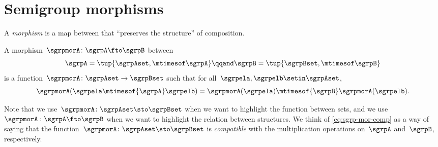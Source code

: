 

\section{Semigroup morphisms}
\label{sec:semigroup-morphisms}

A \emph{morphism} is a map between  that ``preserves the structure'' of composition.



\begin{ctdefinition}
    \label{def:semigroup-mor}
    A morphism~$\sgrpmorA\colon \sgrpA \fto \sgrpB$ between  \begin{equation}
        \label{eq:sgrpAB}
        \sgrpA = \tup{\sgrpAset, \mtimesof\sgrpA}
        \qqand
        \sgrpB = \tup{\sgrpBset, \mtimesof\sgrpB}
    \end{equation}
    is a function~$\sgrpmorA\colon \sgrpAset \to \sgrpBset$ such that for all~$\sgrpela, \sgrpelb \setin \sgrpAset$,
    \begin{equation}
        \label{eq:sgrp-mor-comp}
        \sgrpmorA(\sgrpela \mtimesof{\sgrpA} \sgrpelb) = \sgrpmorA (\sgrpela) \mtimesof{\sgrpB} \sgrpmorA(\sgrpelb).
    \end{equation}
\end{ctdefinition}

Note that we use~$\sgrpmorA\colon \sgrpAset \sto \sgrpBset$ when we want to highlight the function between sets, and we use~$\sgrpmorA: \sgrpA \fto \sgrpB$ when we want to highlight the relation between  structures.
We think of \cref{eq:sgrp-mor-comp} as a way of saying that the function~$\sgrpmorA\colon \sgrpAset \sto \sgrpBset$ is \emph{compatible} with the multiplication operations on~$\sgrpA$ and~$\sgrpB$, respectively.

